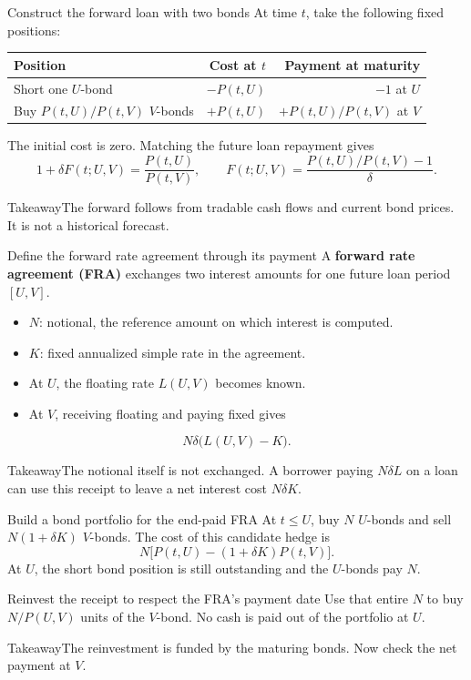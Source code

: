 \documentclass[handout,10pt,t,aspectratio=169]{beamer}
\newenvironment{keybox}{\begin{exampleblock}{Takeaway}}{\end{exampleblock}}
\begin{document}
\begin{frame}{Construct the forward loan with two bonds}
At time \(t\), take the following fixed positions:
\begin{center}\begin{tabular}{lrr}
\toprule Position & Cost at \(t\) & Payment at maturity\\\midrule
Short one \(U\)-bond & \(-P(t,U)\) & \(-1\) at \(U\)\\
Buy \(P(t,U)/P(t,V)\) \(V\)-bonds & \(+P(t,U)\) & \(+P(t,U)/P(t,V)\) at \(V\)\\\bottomrule
\end{tabular}\end{center}
The initial cost is zero. Matching the future loan repayment gives
\[
 1+\delta F(t;U,V)=\frac{P(t,U)}{P(t,V)},\qquad
 \boxed{F(t;U,V)=\frac{P(t,U)/P(t,V)-1}{\delta}.}
\]
\begin{keybox}The forward follows from tradable cash flows and current bond prices.
It is not a historical forecast.\end{keybox}
\end{frame}

\begin{frame}{Define the forward rate agreement through its payment}
A \textbf{forward rate agreement (FRA)} exchanges two interest amounts
for one future loan period \([U,V]\).
\begin{itemize}
\item \(N\): notional, the reference amount on which interest is computed.
\item \(K\): fixed annualized simple rate in the agreement.
\item At \(U\), the floating rate \(L(U,V)\) becomes known.
\item At \(V\), receiving floating and paying fixed gives
\end{itemize}
\[
 \boxed{N\delta\big(L(U,V)-K\big).}
\]
\begin{keybox}The notional itself is not exchanged. A borrower paying
\(N\delta L\) on a loan can use this receipt to leave a net interest cost \(N\delta K\).\end{keybox}
\end{frame}

\begin{frame}{Build a bond portfolio for the end-paid FRA}
At \(t\leq U\), buy \(N\) \(U\)-bonds and sell \(N(1+\delta K)\) \(V\)-bonds.
The cost of this candidate hedge is
\[
 N\big[P(t,U)-(1+\delta K)P(t,V)\big].
\]
At \(U\), the short bond position is still outstanding and the \(U\)-bonds pay \(N\).
\begin{block}{Reinvest the receipt to respect the FRA's payment date}
Use that entire \(N\) to buy \(N/P(U,V)\) units of the \(V\)-bond.
No cash is paid out of the portfolio at \(U\).
\end{block}
\begin{keybox}The reinvestment is funded by the maturing bonds.
Now check the net payment at \(V\).\end{keybox}
\end{frame}
\end{document}
